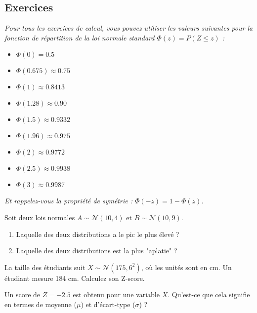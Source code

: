 \subsection{Exercices}

\textit{Pour tous les exercices de calcul, vous pouvez utiliser les valeurs suivantes pour la fonction de répartition de la loi normale standard $\Phi(z) = P(Z \le z)$ :}
\begin{itemize}
    \item $\Phi(0) = 0.5$
    \item $\Phi(0.675) \approx 0.75$
    \item $\Phi(1) \approx 0.8413$
    \item $\Phi(1.28) \approx 0.90$
    \item $\Phi(1.5) \approx 0.9332$
    \item $\Phi(1.96) \approx 0.975$
    \item $\Phi(2) \approx 0.9772$
    \item $\Phi(2.5) \approx 0.9938$
    \item $\Phi(3) \approx 0.9987$
\end{itemize}
\textit{Et rappelez-vous la propriété de symétrie : $\Phi(-z) = 1 - \Phi(z)$.}


\begin{exercicebox}
Soit deux lois normales $A \sim \mathcal{N}(10, 4)$ et $B \sim \mathcal{N}(10, 9)$.
\begin{enumerate}
    \item Laquelle des deux distributions a le pic le plus élevé ?
    \item Laquelle des deux distributions est la plus "aplatie" ?
\end{enumerate}
\end{exercicebox}

\begin{exercicebox}
La taille des étudiants suit $X \sim \mathcal{N}(175, 6^2)$, où les unités sont en cm. Un étudiant mesure 184 cm. Calculez son Z-score.
\end{exercicebox}

\begin{exercicebox}
Un score de $Z = -2.5$ est obtenu pour une variable $X$. Qu'est-ce que cela signifie en termes de moyenne ($\mu$) et d'écart-type ($\sigma$) ?
\end{exercicebox}

